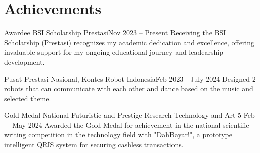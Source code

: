 \section{Achievements}
\resumeSubHeadingListStart
    
    \achiSubheading
    {Awardee BSI Scholarship Prestasi}{Nov 2023 -- Present}
    {Receiving the BSI Scholarship (Prestasi) recognizes my academic dedication and excellence, offering invaluable support for my ongoing educational journey and leadearship development.}{}

    \achiSubheading
    {Pusat Prestasi Nasional, Kontes Robot Indonesia}{Feb 2023 - July 2024}
    {Designed 2 robots that can communicate with each other and dance based on the music and selected theme.}{}
    \resumeItemListStart
    \resumeItemListEnd

    \achiSubheading
    {Gold Medal National Futuristic and Prestige Research Technology and Art 5 }{Feb –- May 2024}
    {Awarded the Gold Medal for achievement in the national scientific writing competition in the technology field with "DahBayar!", a prototype intelligent QRIS system for securing cashless transactions.}{}

\resumeSubHeadingListEnd